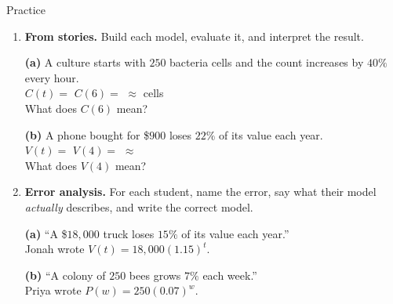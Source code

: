 \documentclass[10pt]{article}
\begin{document}
\begin{notesbox}{Practice}
\begin{enumerate}[leftmargin=1.9em, itemsep=12pt]
  \item \textbf{From stories.} Build each model, evaluate it, and interpret the result.

    \textbf{(a)} A culture starts with $250$ bacteria cells and the count increases by $40\%$ every
    hour. \\[3pt]
    $C(t)=$ \blank{3.4cm} \quad $C(6)=$ \blank{3.0cm} $\approx$ \blank{2.0cm} cells \\[3pt]
    What does $C(6)$ mean? \writeline

    \vspace{4pt}
    \textbf{(b)} A phone bought for \$$900$ loses $22\%$ of its value each year. \\[3pt]
    $V(t)=$ \blank{3.4cm} \quad $V(4)=$ \blank{3.0cm} $\approx$ \blank{2.0cm} \\[3pt]
    What does $V(4)$ mean? \writeline

  \item \textbf{Error analysis.} For each student, name the error, say what their model
    \emph{actually} describes, and write the correct model.

    \textbf{(a)} ``A \$$18{,}000$ truck loses $15\%$ of its value each year.'' \\
    \hspace*{1.2em} Jonah wrote $V(t) = 18{,}000(1.15)^{t}$. 

    \textbf{(b)} ``A colony of $250$ bees grows $7\%$ each week.'' \\
    \hspace*{1.2em} Priya wrote $P(w) = 250(0.07)^{w}$. 
\end{enumerate}
\end{notesbox}
\end{document}
